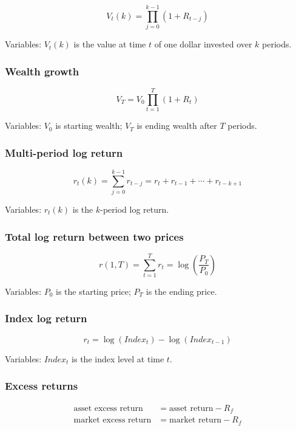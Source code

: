 \documentclass[
  8pt,
  twocolumn]{extarticle}
\begin{document}
\[
V_t(k)=\prod_{j=0}^{k-1}(1+R_{t-j})
\]

Variables: \(V_t(k)\) is the value at time \(t\) of one dollar invested
over \(k\) periods.

\subsubsection{Wealth growth}\label{wealth-growth}

\[
V_T=V_0\prod_{t=1}^{T}(1+R_t)
\]

Variables: \(V_0\) is starting wealth; \(V_T\) is ending wealth after
\(T\) periods.

\subsubsection{Multi-period log return}\label{multi-period-log-return}

\[
r_t(k)=\sum_{j=0}^{k-1}r_{t-j}=r_t+r_{t-1}+\cdots+r_{t-k+1}
\]

Variables: \(r_t(k)\) is the \(k\)-period log return.

\subsubsection{Total log return between two
prices}\label{total-log-return-between-two-prices}

\[
r(1,T)=\sum_{t=1}^{T}r_t=\log\left(\frac{P_T}{P_0}\right)
\]

Variables: \(P_0\) is the starting price; \(P_T\) is the ending price.

\subsubsection{Index log return}\label{index-log-return}

\[
r_t=\log(Index_t)-\log(Index_{t-1})
\]

Variables: \(Index_t\) is the index level at time \(t\).

\subsubsection{Excess returns}\label{excess-returns}

\[
\begin{aligned}
\text{asset excess return} &= \text{asset return}-R_f \\
\text{market excess return} &= \text{market return}-R_f
\end{aligned}
\]
\end{document}
